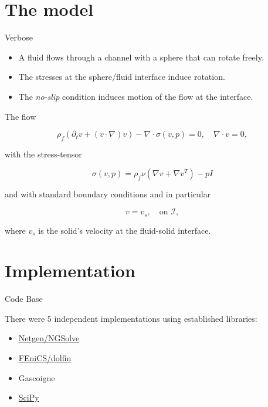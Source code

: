 \section{The model}\label{the-model}

\begin{frame}{Verbose}

\begin{itemize}
\tightlist
\item
  A fluid flows through a channel with a sphere that can rotate freely.
\item
  The stresses at the sphere/fluid interface induce rotation.
\item
  The \emph{no-slip} condition induces motion of the flow at the
  interface.
\end{itemize}

\end{frame}

\begin{frame}

\begin{block}{The flow}

\begin{equation*}
        \rho_f\left(\partial_t v + (v \cdot\nabla)v \right) - \nabla \cdot \sigma(v ,p) = 0, \quad \nabla\cdot v  = 0,
\end{equation*}

with the stress-tensor

\begin{equation*}
    \sigma (v,p) = \rho _ f\nu\left( \nabla v+\nabla v^T \right) - p I
\end{equation*}

and with standard boundary conditions and in particular

\begin{equation*}
    v = v_s, \quad \text{on } \mathcal I,
\end{equation*}

where \(v_s\) is the solid's velocity at the fluid-solid interface.

\end{block}

\end{frame}

\section{Implementation}\label{implementation}

\begin{frame}{Code Base}

There were 5 independent implementations using established libraries:

\begin{itemize}
\tightlist
\item
  \href{https://ngsolve.org/}{Netgen/NGSolve}
\item
  \href{https://fenicsproject.org/download/}{FEniCS/dolfin}
\item
  Gascoigne
\item
  \href{https://www.scipy.org}{SciPy}
\end{itemize}

\end{frame}

